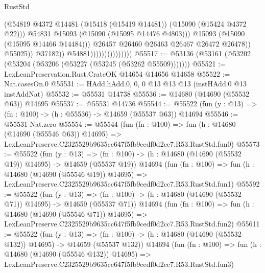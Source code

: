 \begin{lexlean}{RustStd}
\begin{coremodule}
                                                  (@54819
                                                    @4372
                                                    @14481
                                                    (@15418 (@15419 @14481))
                                                    (@15090 (@15424 @4372 @22)))
                                                  @54831
                                                  @15093
                                                  (@15090 (@15095 @14476 @4803)))
                                                @15093
                                                (@15090 (@15095 @14466 @14484)))
                                              @26457
                                              @26460
                                              @26463
                                              @26467
                                              @26472
                                              @26478))
                                          @55025))
                                      @37182))
                                  @54881)))))))))))))))
@55517 := @53136 (@53161 (@53202 (@53204 (@53206 (@53227 (@53245 (@53262 @55509)))))))
@55521 := LexLeanPreservation.Rust.CrateOK @14654 @14656 @14658
@55522 := Nat.casesOn.{0}
@55531 := HAdd.hAdd.{0, 0, 0} @13 @13 @13 (instHAdd.{0} @13 instAddNat)
@55532 := @55531 @14738
@55536 := @14680 (@14690 (@55532 @63)) @14695
@55537 := @55531 @14736
@55544 := @55522 (fun (y : @13) => (fn : @100) -> (h : @55536) -> @14659 (@55537 @63)) @14694
@55546 := @55531 Nat.zero
@55554 := @55544
    (fun (fn : @100) =>
    fun (h : @14680 (@14690 (@55546 @63)) @14695) =>
    LexLeanPreserve.C2325529b9635cc647f5fb9cedf0d2cc7.R53.RustStd.fun0)
@55573 := @55522
    (fun (y : @13) =>
    (fn : @100) -> (h : @14680 (@14690 (@55532 @19)) @14695) -> @14659 (@55537 @19))
    @14694
    (fun (fn : @100) =>
    fun (h : @14680 (@14690 (@55546 @19)) @14695) =>
    LexLeanPreserve.C2325529b9635cc647f5fb9cedf0d2cc7.R53.RustStd.fun1)
@55592 := @55522
    (fun (y : @13) =>
    (fn : @100) -> (h : @14680 (@14690 (@55532 @71)) @14695) -> @14659 (@55537 @71))
    @14694
    (fun (fn : @100) =>
    fun (h : @14680 (@14690 (@55546 @71)) @14695) =>
    LexLeanPreserve.C2325529b9635cc647f5fb9cedf0d2cc7.R53.RustStd.fun2)
@55611 := @55522
    (fun (y : @13) =>
    (fn : @100) -> (h : @14680 (@14690 (@55532 @132)) @14695) -> @14659 (@55537 @132))
    @14694
    (fun (fn : @100) =>
    fun (h : @14680 (@14690 (@55546 @132)) @14695) =>
    LexLeanPreserve.C2325529b9635cc647f5fb9cedf0d2cc7.R53.RustStd.fun3)

\end{coremodule}
\end{lexlean}

